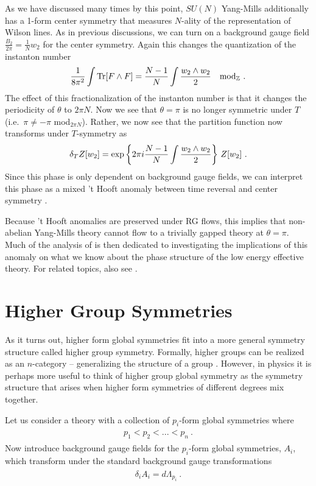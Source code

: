 \documentclass[11pt]{article}
\newcommand{\eq}[1]{\begin{align}\begin{split}#1\end{split}\end{align}}
\def\Tr{{\rm Tr}}
\def\IZ{{\mathbb{Z}}}
\begin{document}
As we have discussed many times by this point, 
$SU(N)$ Yang-Mills additionally has a 1-form center symmetry that measures $N$-ality of the representation of Wilson lines. As in previous discussions, we can turn on a background gauge field $\frac{B_2}{2\pi}=\frac{1}{N}w_2$ for the center symmetry. Again this changes the quantization of the instanton number
\eq{
\frac{1}{8\pi^2}\int \Tr[F\wedge F]=\frac{N-1}{N}\int \frac{w_2\wedge w_2}{2}\quad {\rm mod}_\IZ~. 
}
The effect of this fractionalization of the instanton number is that it changes the periodicity of $\theta$ to $2\pi N$. Now we see that $\theta=\pi$ is no longer symmetric under $T$ (i.e.~$\pi\neq -\pi $ mod$_{2\pi N}$). 
Rather, we now see that the partition function now transforms  under $T$-symmetry as
\eq{
\delta_TZ[w_2]={\rm exp}\left\{2\pi i\frac{N-1}{N}\int \frac{w_2\wedge w_2}{2}\right\}\,Z[w_2]~.
}
Since this phase is only dependent on background gauge fields, we can interpret this phase as a mixed 't Hooft anomaly between time reversal and center symmetry \cite{Gaiotto:2017yup}. 

Because 't Hooft anomalies are preserved under RG flows, this implies that non-abelian Yang-Mills theory cannot flow to a trivially gapped theory at $\theta=\pi$. Much of the analysis of \cite{Gaiotto:2017yup} is then dedicated to investigating the implications of this anomaly on what we know about the phase structure of the low energy effective theory. For related topics, also see \cite{Komargodski:2017keh,Gaiotto:2017tne,Gomis:2017ixy,Cordova:2017kue,Cordova:2018acb}.  

\section{Higher Group Symmetries}
\label{sec:highergroup}

As it turns out, higher form global symmetries fit into a more general  symmetry structure called higher group symmetry. Formally, higher groups can be realized as an $n$-category -- generalizing the structure of a group \cite{Baez:2004in,Baez:2010ya}. However, in physics it  is perhaps more useful to think of higher group global symmetry as the symmetry structure that arises when higher form symmetries of different degrees mix together. 

Let us consider a theory with a collection of $p_i$-form global symmetries where 
\eq{
p_1<p_2<...<p_n~.
}
Now introduce background gauge fields for the $p_i$-form global symmetries, $A_i$, which transform under the standard background gauge transformations 
\eq{\label{eqtrans}
\delta_i A_i=d\Lambda_{p_i}~. 
}
\end{document}
